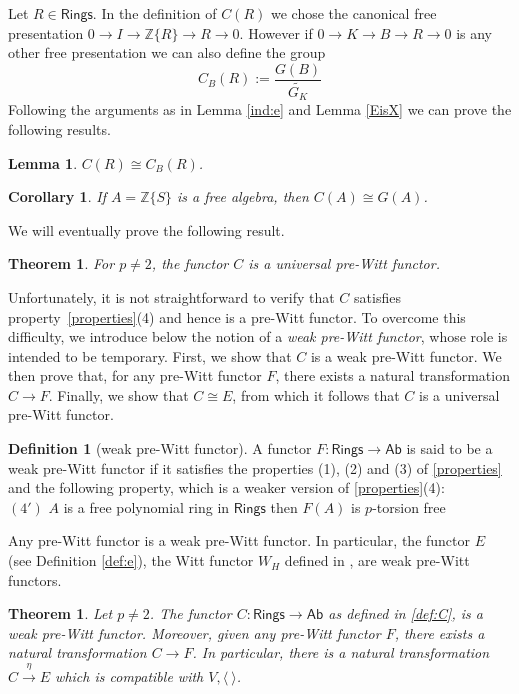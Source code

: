 \documentclass[11pt]{amsart}
\theoremstyle{plain}
\newtheorem{theorem}[thm]{Theorem}
\newtheorem{lemma}[thm]{Lemma}
\newtheorem{corollary}[thm]{Corollary}
\theoremstyle{definition}
\newtheorem{definition}[thm]{Definition}
\renewcommand{\tilde}{\widetilde}
\newcommand{\Z}{{\mathbb Z}}
\newcommand{\ab}[1]{\langle {#1} \rangle}
\newcommand{\Rings}{{\mathsf{Rings}}}
\newcommand{\Ab}{{\mathsf{Ab}}}
\begin{document}
Let $R\in \Rings$. In the definition of $C(R)$ we chose the canonical free presentation $0 \to I \to \Z\{R\} \to R\to 0$. However if  $ 0 \to K \to B \to R \to 0$ is any other free presentation we can also define the group 
$$C_B(R) := \frac{G(B)}{\tilde{G_K}}$$
Following the arguments as in Lemma \ref{ind:e} and Lemma \ref{EisX} we can prove the following results.

\begin{lemma}\label{ind:C} $C(R) \cong C_B(R)$.
\end{lemma}

\begin{corollary}\label{ceqg}
If $A=\Z\{S\}$ is a free algebra, then $C(A) \cong G(A)$.
\end{corollary}

\noindent We will eventually prove the following result.
\begin{theorem}
For $p \neq 2$, the functor $C$ is a universal pre-Witt functor.
\end{theorem}

\noindent Unfortunately, it is not straightforward to verify that $C$ satisfies property~\ref{properties}(4) and hence is a pre-Witt functor. To overcome this difficulty, we introduce below the notion of a \emph{weak pre-Witt functor}, whose role is intended to be temporary. First, we show that $C$ is a weak pre-Witt functor.  We then prove that, for any pre-Witt functor $F$, there exists a natural transformation $C \to F$. Finally, we show that $C \cong E$, from which it follows that $C$ is a universal pre-Witt functor.
\begin{definition}[weak pre-Witt functor]\label{def:weakpre} A functor $F: \Rings \to  \mathsf{Ab}$ is said to be a weak pre-Witt functor if it satisfies the properties (1), (2) and (3) of \ref{properties} and the following property, which is a weaker version of  \ref{properties}(4): \\

$(4')$ $A$ is a free polynomial ring in $\Rings$ then $F(A)$ is $p$-torsion free
\end{definition} 
\vspace{1mm}
\noindent Any pre-Witt functor is a weak pre-Witt functor. In particular, the functor $E$ (see Definition \ref{def:e}), the Witt functor $W_H$ defined in \cite{h1}, \cite{h2} are weak pre-Witt functors. 
 
\begin{theorem}\label{universalweakprewitt} Let $p\neq 2$.  The functor $C: \Rings \to \Ab$ as defined in \ref{def:C}, is a weak pre-Witt functor.  Moreover, given any pre-Witt functor $F$, there exists a natural transformation $C \to F$. In particular, there is a natural transformation $C\xrightarrow{\eta} E$ which is compatible with $V, \ab{ \ }$.
\end{theorem}
\end{document}
